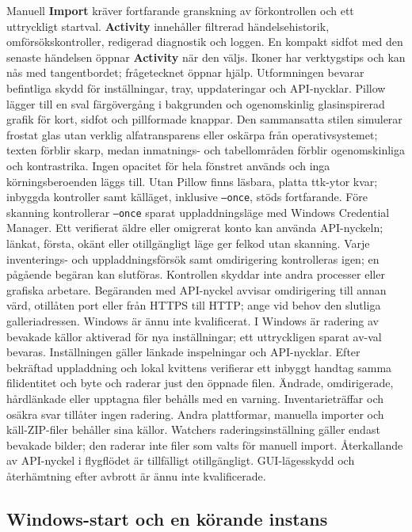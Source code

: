 \documentclass[11pt,a4paper]{article}
\newcommand{\ui}[1]{\textbf{#1}}
\begin{document}
Manuell \ui{Import} kräver fortfarande granskning av förkontrollen och ett
uttryckligt startval. \ui{Activity} innehåller filtrerad händelsehistorik,
omförsökskontroller, redigerad diagnostik och loggen. En kompakt sidfot med den
senaste händelsen öppnar \ui{Activity} när den väljs. Ikoner har verktygstips
och
kan nås med tangentbordet; frågetecknet öppnar hjälp.
Utformningen bevarar befintliga skydd för inställningar, tray, uppdateringar och
API-nycklar. Pillow lägger till en sval färgövergång i bakgrunden och
ogenomskinlig
glasinspirerad grafik för kort, sidfot och pillformade knappar. Den sammansatta
stilen simulerar frostat glas utan verklig alfatransparens eller oskärpa från
operativsystemet; texten förblir skarp, medan inmatnings- och tabellområden
förblir ogenomskinliga och kontrastrika. Ingen opacitet för hela fönstret
används och inga
körningsberoenden läggs till. Utan Pillow finns läsbara, platta ttk-ytor kvar;
inbyggda kontroller samt källäget, inklusive \texttt{--once}, stöds fortfarande.
Före skanning kontrollerar \texttt{--once} sparat uppladdningsläge med Windows
Credential Manager. Ett verifierat äldre eller omigrerat konto kan använda
API-nyckeln; länkat, första, okänt eller otillgängligt läge ger felkod utan
skanning. Varje inventerings- och uppladdningsförsök samt omdirigering
kontrolleras igen; en pågående begäran kan slutföras. Kontrollen skyddar inte
andra processer eller grafiska arbetare. Begäranden med API-nyckel avvisar
omdirigering till annan värd, otillåten port eller från HTTPS till HTTP;
ange vid behov den slutliga galleriadressen. Windows är ännu inte kvalificerat.
I Windows är radering av bevakade källor aktiverad för nya inställningar;
ett uttryckligen sparat av-val bevaras. Inställningen gäller länkade
inspelningar och API-nycklar. Efter bekräftad uppladdning och lokal kvittens
verifierar ett inbyggt handtag samma filidentitet och byte och raderar just
den öppnade filen. Ändrade, omdirigerade, hårdlänkade eller upptagna filer
behålls med en varning. Inventarieträffar och osäkra svar tillåter ingen
radering. Andra plattformar, manuella importer och käll-ZIP-filer behåller
sina källor. Watchers raderingsinställning gäller endast bevakade bilder;
den raderar inte filer som valts för manuell import.
Återkallande av API-nyckel i flygflödet är tillfälligt otillgängligt.
GUI-lägesskydd och återhämtning efter avbrott är ännu inte kvalificerade.

\subsection{Windows-start och en körande instans}
\end{document}
